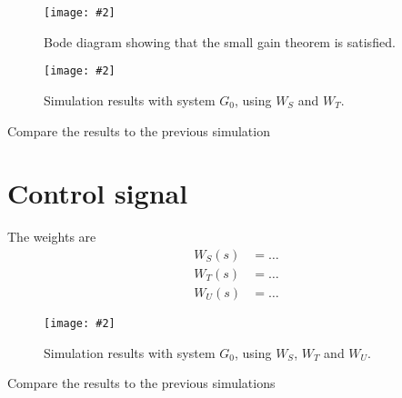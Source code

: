 \documentclass[11pt,a4paper]{article}
\newcommand{\image}[3]{
	\begin{figure}[!ht]
		\centering
	    \texttt{[image: \#2]}
		\caption{#3}
		\label{fig:#2}
	\end{figure}
}
\begin{document}
	\image{0.8}{41}{Bode diagram showing that the small gain theorem is satisfied.}
	\image{0.8}{41}{Simulation results with system $G_0$, using $W_S$ and $W_T$.}

\par Compare the results to the previous simulation
\par\dotfill\par\dotfill\par


\section*{Control signal}
\par The weights are
	\begin{align*}
		W_S(s) &= \ldots\\
		W_T(s) &= \ldots\\
		W_U(s) &= \ldots
	\end{align*}

	\image{0.8}{41}{Simulation results with system $G_0$, using $W_S$, $W_T$ and $W_U$.}

\par Compare the results to the previous simulations
\par\dotfill\par\dotfill\par
\end{document}
